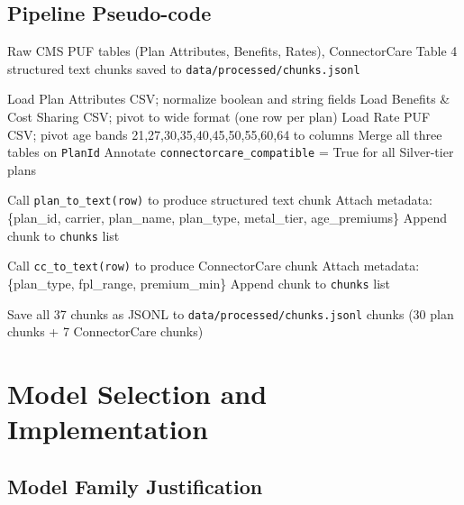 \documentclass[12pt, letterpaper]{article}
\newenvironment{pseudoblock}[1]{%
  \begin{mdframed}[
    backgroundcolor=pseudobg,
    linecolor=pseudoframe,
    linewidth=1.5pt,
    frametitle={\color{pseudoframe}\bfseries\small Pseudo-code: #1},
    frametitlebackgroundcolor=pseudoframe!15
  ]
  \begin{algorithmic}[1]
}{%
  \end{algorithmic}
  \end{mdframed}
}
\begin{document}
\subsection{Pipeline Pseudo-code}

\begin{pseudoblock}{End-to-End Data Preprocessing Pipeline}
\REQUIRE Raw CMS PUF tables (Plan Attributes, Benefits, Rates), ConnectorCare Table 4
 structured text chunks saved to \texttt{data/processed/chunks.jsonl}

\STATE Load Plan Attributes CSV; normalize boolean and string fields
\STATE Load Benefits \& Cost Sharing CSV; pivot to wide format (one row per plan)
\STATE Load Rate PUF CSV; pivot age bands 21,27,30,35,40,45,50,55,60,64 to columns
\STATE Merge all three tables on \texttt{PlanId}
\STATE Annotate \texttt{connectorcare\_compatible} = True for all Silver-tier plans

    \STATE Call \texttt{plan\_to\_text(row)} to produce structured text chunk
    \STATE Attach metadata: \{plan\_id, carrier, plan\_name, plan\_type, metal\_tier, age\_premiums\}
    \STATE Append chunk to \texttt{chunks} list
\ENDFOR

    \STATE Call \texttt{cc\_to\_text(row)} to produce ConnectorCare chunk
    \STATE Attach metadata: \{plan\_type, fpl\_range, premium\_min\}
    \STATE Append chunk to \texttt{chunks} list
\ENDFOR

\STATE Save all 37 chunks as JSONL to \texttt{data/processed/chunks.jsonl}
\RETURN chunks (30 plan chunks + 7 ConnectorCare chunks)
\end{pseudoblock}

\section{Model Selection and Implementation}
\label{sec:model}

\subsection{Model Family Justification}
\end{document}
